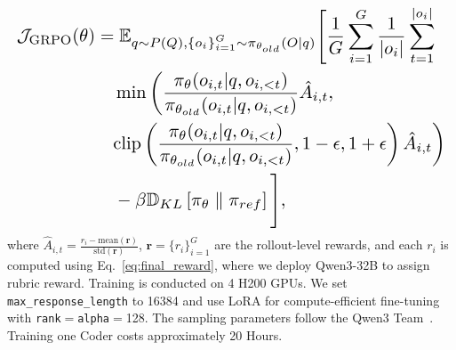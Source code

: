 {\tiny
\begin{equation}
\resizebox{\linewidth}{!}{$\displaystyle
    \begin{aligned}
        \mathcal{J}_{\text{GRPO}}(\theta) 
        &= \mathbb{E}_{\substack{q \sim P(Q),  \{o_i\}_{i=1}^G \sim \pi_{\theta_{old}}(O|q)}} 
        \Bigg[ \frac{1}{G} \sum_{i=1}^G \frac{1}{|o_i|} \sum_{t=1}^{|o_i|} \\
        &\quad \min \bigg( 
            \frac{\pi_\theta(o_{i,t} | q, o_{i,<t})}{\pi_{\theta_{old}}(o_{i,t} | q, o_{i,<t})} \hat{A}_{i,t}, \\
        &\quad \text{clip} \left( 
            \frac{\pi_\theta(o_{i,t} | q, o_{i,<t})}{\pi_{\theta_{old}}(o_{i,t} | q, o_{i,<t})}, 1 - \epsilon, 1 + \epsilon 
        \right) \hat{A}_{i,t} 
        \bigg) \\
        &\quad - \beta \mathbb{D}_{KL} \left[ \pi_{\theta} \parallel \pi_{ref} \right] \Bigg],
    \end{aligned}$}
    \label{eq:GRPO-obj}
\end{equation}
}
where $\hat{A}_{i,t} = \frac{r_i - \mathrm{mean}(\mathbf{r})}{\mathrm{std}(\mathbf{r})}$,
$\mathbf{r}=\{r_i\}_{i=1}^{G}$ are the rollout-level rewards, and each $r_i$ is
computed using Eq.~\ref{eq:final_reward}, where we deploy Qwen3-32B to assign rubric reward. Training is conducted on 4 H200 GPUs. We set \texttt{max\_response\_length} to 16384 and use LoRA for compute-efficient fine-tuning with \texttt{rank}$=$\texttt{alpha}$=$128. The sampling parameters follow the Qwen3 Team~\cite{qwen3technicalreport}. Training one Coder costs approximately 20 Hours.




\label{RLdesign}